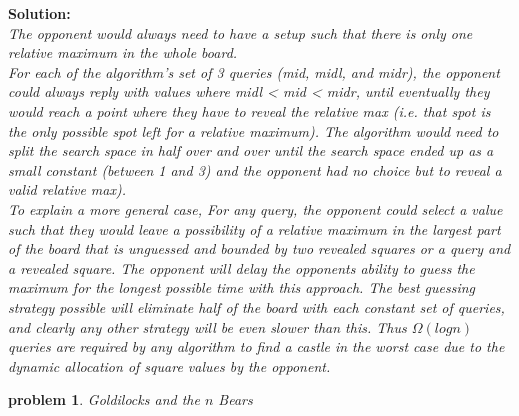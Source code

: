 \documentclass[10pt]{article}
\newtheorem{problem}{\sc\color{cit}problem}
\begin{document}
\begin{enumerate}
    \textbf{Solution:} \\
    \emph{
    The opponent would always need to have a setup such that there is only one relative maximum in the whole board. \\
    For each of the algorithm's set of 3 queries (mid, midl, and midr), the opponent could always reply with values where midl < mid < midr, until eventually they would reach a point where they have to reveal the relative max (i.e. that spot is the only possible spot left for a relative maximum). The algorithm would need to split the search space in half over and over until the search space ended up as a small constant (between 1 and 3) and the opponent had no choice but to reveal a valid relative max). \\ To explain a more general case, For any query, the opponent could select a value such that they would leave a possibility of a relative maximum in the largest part of the board that is unguessed and bounded by two revealed squares or a query and a revealed square. The opponent will delay the opponents ability to guess the maximum for the longest possible time with this approach. The best guessing strategy possible will eliminate half of the board with each constant set of queries, and clearly any other strategy will be even slower than this.
    Thus $\Omega(logn)$ queries are required by any algorithm to find a castle in the worst case due to the dynamic allocation of square values by the opponent.
    }
\end{enumerate}

\pagebreak

\begin{problem} Goldilocks and the $n$ Bears \end{problem}
\end{document}
